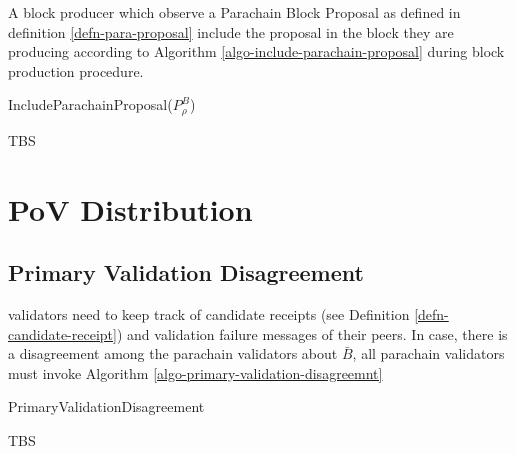 A block producer which observe a Parachain Block Proposal as defined in definition \ref{defn-para-proposal}  include the proposal in the block they are producing according to Algorithm \ref{algo-include-parachain-proposal} during block production procedure.

\begin{algorithm}[H]
  \caption[]{\sc IncludeParachainProposal($P^B_{\rho}$)}
  \label{algo-include-parachain-proposal}
  \begin{algorithmic}[1]
    \Require{}

    \State TBS
  \end{algorithmic}
\end{algorithm}

\section{PoV Distribution}


\subsection{Primary Validation Disagreement}
\label{sect-primary-validation-disagreemnt}
 validators need to keep track of candidate receipts
(see Definition \ref{defn-candidate-receipt}) and validation failure messages of
their peers. In case, there is a disagreement among the parachain validators
about $\bar{B}$, all parachain validators must invoke Algorithm
\ref{algo-primary-validation-disagreemnt}

\begin{algorithm}[H]
  \caption[]{\sc PrimaryValidationDisagreement}
  \label{algo-primary-validation-disagreemnt}
  \begin{algorithmic}[1]
    \Require{}

    \State TBS
  \end{algorithmic}
\end{algorithm}
